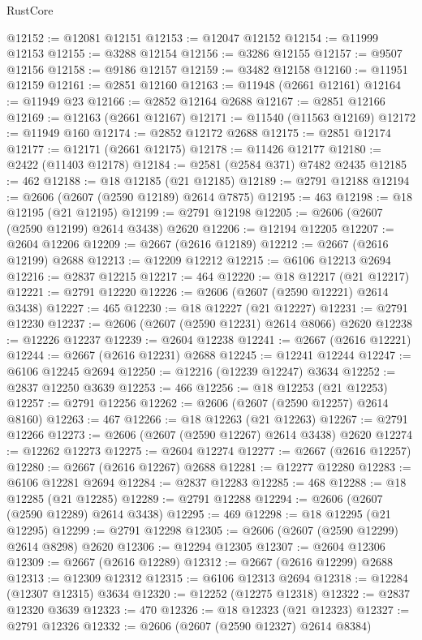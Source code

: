 \begin{lexlean}{RustCore}
\begin{coremodule}
@12152 := @12081 @12151
@12153 := @12047 @12152
@12154 := @11999 @12153
@12155 := @3288 @12154
@12156 := @3286 @12155
@12157 := @9507 @12156
@12158 := @9186 @12157
@12159 := @3482 @12158
@12160 := @11951 @12159
@12161 := @2851 @12160
@12163 := @11948 (@2661 @12161)
@12164 := @11949 @23
@12166 := @2852 @12164 @2688
@12167 := @2851 @12166
@12169 := @12163 (@2661 @12167)
@12171 := @11540 (@11563 @12169)
@12172 := @11949 @160
@12174 := @2852 @12172 @2688
@12175 := @2851 @12174
@12177 := @12171 (@2661 @12175)
@12178 := @11426 @12177
@12180 := @2422 (@11403 @12178)
@12184 := @2581 (@2584 @371) @7482 @2435
@12185 := 462
@12188 := @18 @12185 (@21 @12185)
@12189 := @2791 @12188
@12194 := @2606 (@2607 (@2590 @12189) @2614 @7875)
@12195 := 463
@12198 := @18 @12195 (@21 @12195)
@12199 := @2791 @12198
@12205 := @2606 (@2607 (@2590 @12199) @2614 @3438) @2620
@12206 := @12194 @12205
@12207 := @2604 @12206
@12209 := @2667 (@2616 @12189)
@12212 := @2667 (@2616 @12199) @2688
@12213 := @12209 @12212
@12215 := @6106 @12213 @2694
@12216 := @2837 @12215
@12217 := 464
@12220 := @18 @12217 (@21 @12217)
@12221 := @2791 @12220
@12226 := @2606 (@2607 (@2590 @12221) @2614 @3438)
@12227 := 465
@12230 := @18 @12227 (@21 @12227)
@12231 := @2791 @12230
@12237 := @2606 (@2607 (@2590 @12231) @2614 @8066) @2620
@12238 := @12226 @12237
@12239 := @2604 @12238
@12241 := @2667 (@2616 @12221)
@12244 := @2667 (@2616 @12231) @2688
@12245 := @12241 @12244
@12247 := @6106 @12245 @2694
@12250 := @12216 (@12239 @12247) @3634
@12252 := @2837 @12250 @3639
@12253 := 466
@12256 := @18 @12253 (@21 @12253)
@12257 := @2791 @12256
@12262 := @2606 (@2607 (@2590 @12257) @2614 @8160)
@12263 := 467
@12266 := @18 @12263 (@21 @12263)
@12267 := @2791 @12266
@12273 := @2606 (@2607 (@2590 @12267) @2614 @3438) @2620
@12274 := @12262 @12273
@12275 := @2604 @12274
@12277 := @2667 (@2616 @12257)
@12280 := @2667 (@2616 @12267) @2688
@12281 := @12277 @12280
@12283 := @6106 @12281 @2694
@12284 := @2837 @12283
@12285 := 468
@12288 := @18 @12285 (@21 @12285)
@12289 := @2791 @12288
@12294 := @2606 (@2607 (@2590 @12289) @2614 @3438)
@12295 := 469
@12298 := @18 @12295 (@21 @12295)
@12299 := @2791 @12298
@12305 := @2606 (@2607 (@2590 @12299) @2614 @8298) @2620
@12306 := @12294 @12305
@12307 := @2604 @12306
@12309 := @2667 (@2616 @12289)
@12312 := @2667 (@2616 @12299) @2688
@12313 := @12309 @12312
@12315 := @6106 @12313 @2694
@12318 := @12284 (@12307 @12315) @3634
@12320 := @12252 (@12275 @12318)
@12322 := @2837 @12320 @3639
@12323 := 470
@12326 := @18 @12323 (@21 @12323)
@12327 := @2791 @12326
@12332 := @2606 (@2607 (@2590 @12327) @2614 @8384)

\end{coremodule}
\end{lexlean}
